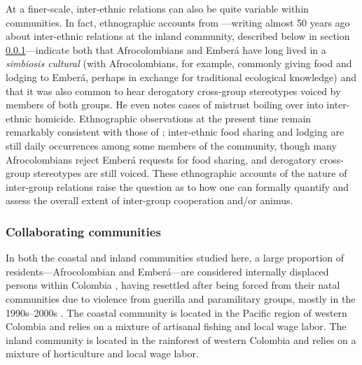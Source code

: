 \documentclass[bibauthoryear]{aa}
\begin{document}
At a finer-scale, inter-ethnic relations can also be quite variable within communities. In fact, ethnographic accounts from \citet{Cay73}---writing almost 50 years ago about inter-ethnic relations at the inland community, described below in section \ref{pops}---indicate both that Afrocolombians and Ember\'a have long lived in a \textit{simbiosis cultural} (with Afrocolombians, for example, commonly giving food and lodging to Ember\'a, perhaps in exchange for traditional ecological knowledge) and that it was also common to hear derogatory cross-group stereotypes voiced by members of both groups. He even notes cases of mistrust boiling over into inter-ethnic homicide. Ethnographic observations at the present time remain remarkably consistent with those of \citet{Cay73}; inter-ethnic food sharing and lodging are still daily occurrences among some members of the community, though many Afrocolombians reject Ember\'a requests for food sharing, and derogatory cross-group stereotypes are still voiced. These ethnographic accounts of the nature of inter-group relations raise the question as to how one can formally quantify and assess the overall extent of inter-group cooperation and/or animus. %

\subsubsection{Collaborating communities}\label{pops}
In both the coastal and inland communities studied here, a large proportion of residents---Afrocolombian and Ember\'a---are considered internally displaced persons within Colombia \citep{oyola2015religion, escobar2003displacement}, having resettled after being forced from their natal communities due to violence from guerilla and paramilitary groups, mostly in the 1990s--2000s \citep{ibanez2009forced}. The coastal community is located in the Pacific region of western Colombia and relies on a mixture of artisanal fishing and local wage labor.  The inland community is located in the rainforest of western Colombia and relies on a mixture of horticulture and local wage labor.
\end{document}
